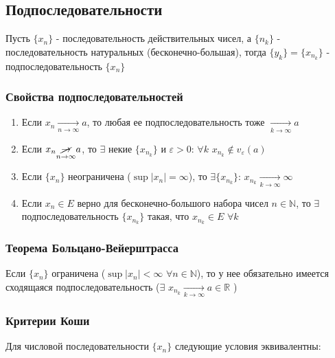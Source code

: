 \documentclass[class=article,a4paper,12pt,crop=false]{standalone}
\begin{document}
\subsection{Подпоследовательности}

Пусть $\{x_n\}$ - последовательность действительных чисел, а $\{n_k\}$ - последовательность
натуральных (бесконечно-большая), тогда $\{y_k\} = \{x_{n_k}\}$ - подпоследовательность $\{x_n\}$

\subsubsection{Свойства подпоследовательностей}

\begin{enumerate}
    \item {
        Если $x_n \underset{n \rightarrow \infty}{\rightarrow} a$, то любая ее
        подпоследовательность тоже $\underset{k \rightarrow \infty}{\rightarrow} a$
    }
    \item {
        Если $x_n \underset{n \rightarrow \infty}{\cancel{\rightarrow}} a$, то $\exists$
        некие $\{x_{n_k}\}$ и $\varepsilon > 0$: $\forall k$
        $x_{n_k} \notin v_{\varepsilon}(a)$
    }
    \item {
        Если $\{x_n\}$ неограничена ($\sup{|x_n|} = \infty$), то 
        $\exists \{x_{n_k}\}$: $x_{n_k} \underset{k \rightarrow \infty}{\rightarrow} \infty$
    }
    \item {
        Если $x_n \in E$ верно для бесконечно-большого набора чисел $n \in \mathbb{N}$, то
        $\exists$ подпоследовательность $\{x_{n_k}\}$ такая, что $x_{n_k} \in E$ $\forall k$
    }
\end{enumerate}

\subsubsection{Теорема Больцано-Вейерштрасса}

Если $\{x_n\}$ ограничена ($\sup{|x_n|} < \infty$ $\forall n \in \mathbb{N}$), то у нее 
обязательно имеется сходящаяся подпоследовательность ($\exists$ $x_{n_k} \underset{k \rightarrow \infty}{\rightarrow} a \in \mathbb{R}$ )

\subsubsection{Критерии Коши}

Для числовой последовательности $\{x_n\}$ следующие условия эквивалентны:
\end{document}
